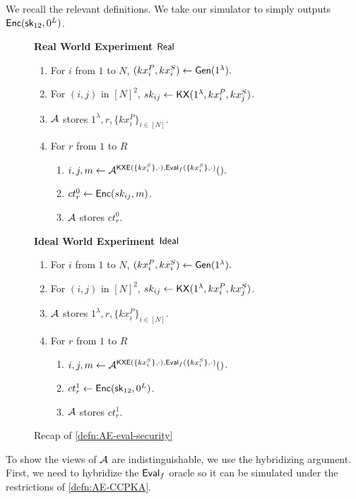 We recall the relevant definitions. We take our simulator to simply outputs $\mathsf{Enc}({\mathsf{sk}}_{12}, 0^{L})$.
\begin{figure}[h!]
\begin{framed}
\textbf{Real World Experiment $\mathsf{Real}$}
\begin{enumerate}
    \item For $i$ from $1$ to $N$, $(kx_i^P, kx_i^S) \leftarrow \mathsf{Gen}(1^{\lambda}).$
    \item For $(i, j)$ in $[N]^2$, $sk_{ij} \leftarrow \mathsf{KX}(1^{\lambda}, kx_i^P, kx_j^S)$.
    \item $\mathcal{A}$ stores $1^{\lambda}, r, \{kx_i^P\}_{i \in [N]}$.
    \item For $r$ from $1$ to $R$
    \begin{enumerate}
        \item $i, j, m \leftarrow \mathcal{A}^{\mathsf{KXE}(\{kx_i^S\}, \cdot), \mathsf{Eval}_f(\{kx_i^S\}, \cdot)}().$
        \item $ct^{0}_r \leftarrow \mathsf{Enc}(sk_{ij}, m)$.
        \item $\mathcal{A}$ stores $ct^{0}_r$.
    \end{enumerate}
\end{enumerate}
\textbf{Ideal World Experiment $\mathsf{Ideal}$}
\begin{enumerate}
    \item For $i$ from $1$ to $N$, $(kx_i^P, kx_i^S) \leftarrow \mathsf{Gen}(1^{\lambda}).$
    \item For $(i, j)$ in $[N]^2$, $sk_{ij} \leftarrow \mathsf{KX}(1^{\lambda}, kx_i^P, kx_j^S)$.
    \item $\mathcal{A}$ stores $1^{\lambda}, r, \{kx_i^P\}_{i \in [N]}$.
    \item For $r$ from $1$ to $R$
    \begin{enumerate}
        \item $i, j, m \leftarrow \mathcal{A}^{\mathsf{KXE}(\{kx_i^S\}, \cdot), \mathsf{Eval}_f(\{kx_i^S\}, \cdot)}()$.
        \item $ct^1_r \leftarrow \mathsf{Enc}({\mathsf{sk}}_{12}, 0^{L})$.
        \item $\mathcal{A}$ stores $ct^{1}_r$.
    \end{enumerate}
\end{enumerate}
\end{framed}
\caption{Recap of \cref{defn:AE-eval-security}}
\end{figure}
To show the views of $\mathcal{A}$ are indistinguishable, we use the hybridizing argument. First, we need to hybridize the $\mathsf{Eval}_f$ oracle so it can be simulated under the restrictions of \cref{defn:AE-CCPKA}. 
